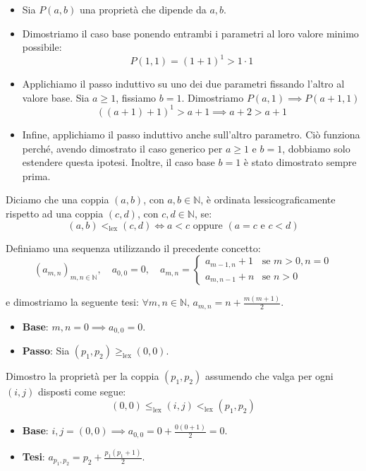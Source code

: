\documentclass[12pt]{report}
\newcommand{\N}{\mathbb{N}}
\begin{document}
	\begin{itemize}
		\item Sia $P(a, b)$ una proprietà che dipende da $a, b$.
		\item Dimostriamo il caso base ponendo entrambi i parametri al loro valore minimo possibile:
		\[
		P(1, 1) = (1+1)^1 > 1 \cdot 1
		\]
		\item Applichiamo il passo induttivo su uno dei due parametri fissando l'altro al valore base. Sia $a \ge 1$, fissiamo $b = 1$. Dimostriamo $P(a, 1) \implies P(a+1, 1)$
		\[
		((a+1) + 1)^1 > a + 1 \implies a + 2 > a + 1
		\]
		\item Infine, applichiamo il passo induttivo anche sull'altro parametro. Ciò funziona perché, avendo dimostrato il caso generico per $a \ge 1$ e $b = 1$, dobbiamo solo estendere questa ipotesi. Inoltre, il caso base $b=1$ è stato dimostrato sempre prima.
	\end{itemize}
	
	Diciamo che una coppia $(a, b)$, con $a, b \in \N$, è ordinata lessicograficamente rispetto ad una coppia $(c, d)$, con $c, d \in \N$, se:
	\[
	(a, b) <_{\text{lex}} (c, d) \iff a < c \text{ oppure } (a = c \text{ e } c < d)
	\]
	
	Definiamo una sequenza utilizzando il precedente concetto:
	\[
	(a_{m, n})_{m, n \in \N}, \quad a_{0, 0} = 0, \quad a_{m, n} = 
	\begin{cases}
		a_{m-1, n} + 1 & \text{se } m > 0, n = 0 \\
		a_{m, n-1} + n & \text{se } n > 0
	\end{cases}
	\]
	
	e dimostriamo la seguente tesi: $\forall m, n \in \N, \, a_{m, n} = n + \frac{m(m+1)}{2}$.
	
	\begin{itemize}
		\item \textbf{Base}: $m, n = 0 \implies a_{0, 0} = 0$.
		\item \textbf{Passo}: Sia $(p_1, p_2) \geq_{\text{lex}} (0, 0)$.
	\end{itemize}
	
	Dimostro la proprietà per la coppia $(p_1, p_2)$ assumendo che valga per ogni $(i, j)$ disposti come segue:
	\[
	(0, 0) \leq_{\text{lex}} (i, j) <_{\text{lex}} (p_1, p_2)
	\]
	
	\begin{itemize}
		\item \textbf{Base}: $i, j = (0, 0) \implies a_{0, 0} = 0 + \frac{0(0+1)}{2} = 0$.
		\item \textbf{Tesi}: $a_{p_1, p_2} = p_2 + \frac{p_1(p_1+1)}{2}$.
	\end{itemize}
	
\end{document}
